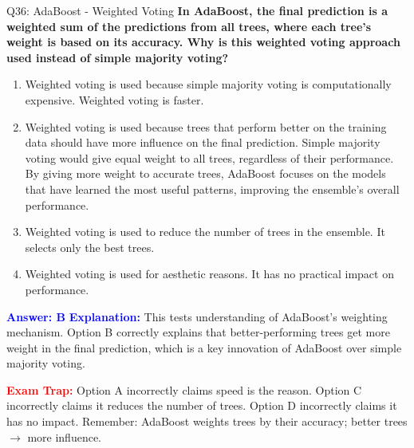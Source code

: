 \documentclass[8pt]{beamer}
\begin{document}
	\begin{frame}{Q36: AdaBoost - Weighted Voting}
		\fontsize{6.5}{7.5}\selectfont
		\textbf{In AdaBoost, the final prediction is a weighted sum of the predictions from all trees, where each tree's weight is based on its accuracy. Why is this weighted voting approach used instead of simple majority voting?}
		
		\begin{enumerate}
			\item Weighted voting is used because simple majority voting is computationally expensive. Weighted voting is faster.
			\item Weighted voting is used because trees that perform better on the training data should have more influence on the final prediction. Simple majority voting would give equal weight to all trees, regardless of their performance. By giving more weight to accurate trees, AdaBoost focuses on the models that have learned the most useful patterns, improving the ensemble's overall performance.
			\item Weighted voting is used to reduce the number of trees in the ensemble. It selects only the best trees.
			\item Weighted voting is used for aesthetic reasons. It has no practical impact on performance.
		\end{enumerate}
		
		\vspace{0.1cm}
		\textcolor{blue}{\textbf{Answer: B}}
		\vspace{0.1cm}
		\textcolor{blue}{\textbf{Explanation:}} This tests understanding of AdaBoost's weighting mechanism. Option B correctly explains that better-performing trees get more weight in the final prediction, which is a key innovation of AdaBoost over simple majority voting.
		
		\textcolor{red}{\textbf{Exam Trap:}} Option A incorrectly claims speed is the reason. Option C incorrectly claims it reduces the number of trees. Option D incorrectly claims it has no impact. Remember: AdaBoost weights trees by their accuracy; better trees $\rightarrow$ more influence.
	\end{frame}
	
\end{document}

